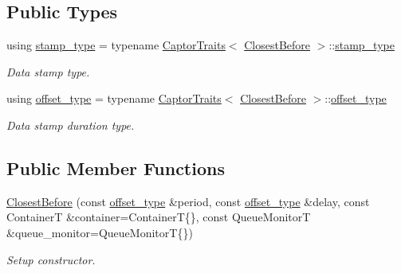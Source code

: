 \subsection*{Public Types}
\begin{DoxyCompactItemize}
\item 
\mbox{\label{classflow_1_1follower_1_1_closest_before_af69e441e1ca309083983a6414cc606a2}} 
using \hyperlink{classflow_1_1follower_1_1_closest_before_af69e441e1ca309083983a6414cc606a2}{stamp\+\_\+type} = typename \hyperlink{structflow_1_1_captor_traits}{Captor\+Traits}$<$ \hyperlink{classflow_1_1follower_1_1_closest_before}{Closest\+Before} $>$\+::\hyperlink{classflow_1_1follower_1_1_closest_before_af69e441e1ca309083983a6414cc606a2}{stamp\+\_\+type}
\begin{DoxyCompactList}\small\item\em Data stamp type. \end{DoxyCompactList}\item 
\mbox{\label{classflow_1_1follower_1_1_closest_before_ad6e3ed90bcd84a7948178e017ea9e79e}} 
using \hyperlink{classflow_1_1follower_1_1_closest_before_ad6e3ed90bcd84a7948178e017ea9e79e}{offset\+\_\+type} = typename \hyperlink{structflow_1_1_captor_traits}{Captor\+Traits}$<$ \hyperlink{classflow_1_1follower_1_1_closest_before}{Closest\+Before} $>$\+::\hyperlink{classflow_1_1follower_1_1_closest_before_ad6e3ed90bcd84a7948178e017ea9e79e}{offset\+\_\+type}
\begin{DoxyCompactList}\small\item\em Data stamp duration type. \end{DoxyCompactList}\end{DoxyCompactItemize}
\subsection*{Public Member Functions}
\begin{DoxyCompactItemize}
\item 
\hyperlink{classflow_1_1follower_1_1_closest_before_ae09d7c8070e56939693f7cdfc6a720fc}{Closest\+Before} (const \hyperlink{classflow_1_1follower_1_1_closest_before_ad6e3ed90bcd84a7948178e017ea9e79e}{offset\+\_\+type} \&period, const \hyperlink{classflow_1_1follower_1_1_closest_before_ad6e3ed90bcd84a7948178e017ea9e79e}{offset\+\_\+type} \&delay, const ContainerT \&container=ContainerT\{\}, const Queue\+MonitorT \&queue\+\_\+monitor=Queue\+MonitorT\{\})
\begin{DoxyCompactList}\small\item\em Setup constructor. \end{DoxyCompactList}\end{DoxyCompactItemize}
